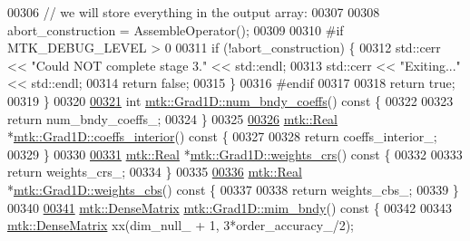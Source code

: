 \begin{DoxyCode}
{{00306   \textcolor{comment}{// we will store everything in the output array:}
00307 
00308   abort\_construction = AssembleOperator();
00309 
00310 \textcolor{preprocessor}{  #if MTK\_DEBUG\_LEVEL > 0}
00311   \textcolor{keywordflow}{if} (!abort\_construction) \{
00312     std::cerr << \textcolor{stringliteral}{"Could NOT complete stage 3."} << std::endl;
00313     std::cerr << \textcolor{stringliteral}{"Exiting..."} << std::endl;
00314     \textcolor{keywordflow}{return} \textcolor{keyword}{false};
00315   \}
00316 \textcolor{preprocessor}{  #endif}
00317 
00318   \textcolor{keywordflow}{return} \textcolor{keyword}{true};
00319 \}
00320 
\hypertarget{mtk__grad__1d_8cc_source_l00321}{}\hyperlink{classmtk_1_1Grad1D_a7168205c21ba00012558f8bba069c119}{00321} \textcolor{keywordtype}{int} \hyperlink{classmtk_1_1Grad1D_a7168205c21ba00012558f8bba069c119}{mtk::Grad1D::num\_bndy\_coeffs}()\textcolor{keyword}{ const }\{
00322 
00323   \textcolor{keywordflow}{return} num\_bndy\_coeffs\_;
00324 \}
00325 
\hypertarget{mtk__grad__1d_8cc_source_l00326}{}\hyperlink{classmtk_1_1Grad1D_a88735f8d2a6ed986370dc3caeb84959b}{00326} \hyperlink{group__c01-roots_gac080bbbf5cbb5502c9f00405f894857d}{mtk::Real} *\hyperlink{classmtk_1_1Grad1D_a88735f8d2a6ed986370dc3caeb84959b}{mtk::Grad1D::coeffs\_interior}()\textcolor{keyword}{ const }\{
00327 
00328   \textcolor{keywordflow}{return} coeffs\_interior\_;
00329 \}
00330 
\hypertarget{mtk__grad__1d_8cc_source_l00331}{}\hyperlink{classmtk_1_1Grad1D_ae5f15d8986a5680b6a1c120283c6cc5e}{00331} \hyperlink{group__c01-roots_gac080bbbf5cbb5502c9f00405f894857d}{mtk::Real} *\hyperlink{classmtk_1_1Grad1D_ae5f15d8986a5680b6a1c120283c6cc5e}{mtk::Grad1D::weights\_crs}()\textcolor{keyword}{ const }\{
00332 
00333   \textcolor{keywordflow}{return} weights\_crs\_;
00334 \}
00335 
\hypertarget{mtk__grad__1d_8cc_source_l00336}{}\hyperlink{classmtk_1_1Grad1D_ad11927d8f9f1ca0089aaa2be7094f7f3}{00336} \hyperlink{group__c01-roots_gac080bbbf5cbb5502c9f00405f894857d}{mtk::Real} *\hyperlink{classmtk_1_1Grad1D_ad11927d8f9f1ca0089aaa2be7094f7f3}{mtk::Grad1D::weights\_cbs}()\textcolor{keyword}{ const }\{
00337 
00338   \textcolor{keywordflow}{return} weights\_cbs\_;
00339 \}
00340 
\hypertarget{mtk__grad__1d_8cc_source_l00341}{}\hyperlink{classmtk_1_1Grad1D_ab25e1d064a5a00fbe3777e65fd5750c0}{00341} \hyperlink{classmtk_1_1DenseMatrix}{mtk::DenseMatrix} \hyperlink{classmtk_1_1Grad1D_ab25e1d064a5a00fbe3777e65fd5750c0}{mtk::Grad1D::mim\_bndy}()\textcolor{keyword}{ const }\{
00342 
00343   \hyperlink{classmtk_1_1DenseMatrix}{mtk::DenseMatrix} xx(dim\_null\_ + 1, 3*order\_accuracy\_/2);
}}
\end{DoxyCode}
